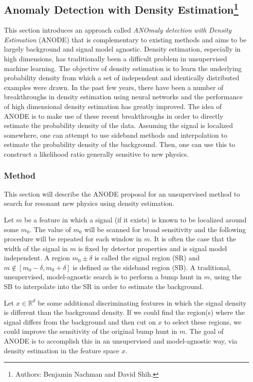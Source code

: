 \documentclass[a4paper,11pt]{article}
\begin{document}
\subsection[Anomaly Detection with Density Estimation]{Anomaly Detection with Density Estimation\footnote{Authors: Benjamin Nachman and David Shih.}}
\label{sec:ANODE}

This section introduces an approach called \textit{ANOmaly detection with Density Estimation} (ANODE) that is complementary to existing methods and aims to be largely background and signal model agnostic.  Density estimation, especially in high dimensions, has traditionally been a difficult problem in unsupervised machine learning. The objective of density estimation is to learn the underlying probability density from which a set of independent and identically distributed examples were drawn. In the past few years, there have been a number of breakthroughs in density estimation using neural networks and the performance of high dimensional density estimation has greatly improved. The idea of ANODE is to make use of these recent breakthroughs in order to directly estimate the probability density of the data. Assuming the signal is localized somewhere, one can attempt to use sideband methods and interpolation to estimate the probability density of the background. Then, one can use this to construct a likelihood ratio generally sensitive to new physics.


\subsubsection{Method}


This section will describe the ANODE proposal for an unsupervised method to search for resonant new physics using density estimation. 

Let $m$ be a feature in which a signal (if it exists) is known to be localized around some $m_0$.  The value of $m_0$ will be scanned for broad sensitivity and the following procedure will be repeated for each window in $m$.  It is often the case that the width of the signal in $m$ is fixed by detector properties and is signal model independent.  A region $m_0\pm\delta$ is called the signal region (SR) and $m\not\in[m_0-\delta,m_0+\delta]$ is defined as the sideband region (SB). A traditional, unsupervised, model-agnostic search is to perform a bump hunt in $m$, using the SB to interpolate into the SR in order to estimate the background.

Let $x\in\mathbb{R}^d$ be some additional discriminating features in which the signal density is different than the background density.  If we could find the region(s) where the signal differs from the background and then cut on $x$ to select these regions, we could improve the sensitivity of the original bump hunt in $m$. The goal of ANODE is to accomplish this in an unsupervised and model-agnostic way, via density estimation in the feature space $x$. 
\end{document}
